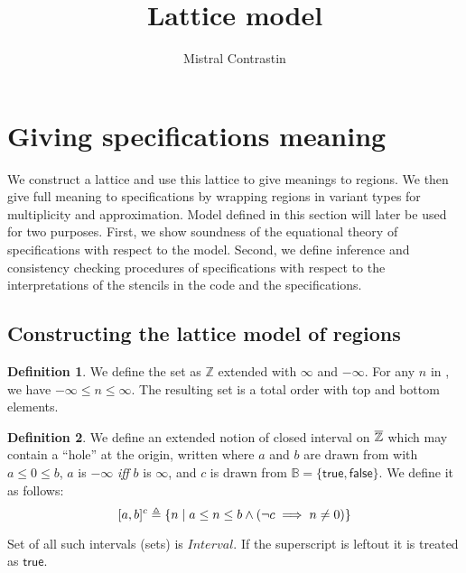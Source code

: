 \documentclass[acmlarge,review]{acmart}
\theoremstyle{definition}
\newtheorem{defn}{Definition}
\theoremstyle{plain}
\theoremstyle{remark}
\begin{document}
\title{Lattice model}
\author{Mistral Contrastin}

\section{Giving specifications meaning}

We construct a lattice and use this lattice to give meanings to regions. We
then give full meaning to specifications by wrapping regions in variant types
for multiplicity and approximation. Model defined in this section will later be
used for two purposes. First, we show soundness of the equational theory of
specifications with respect to the model. Second, we define inference and
consistency checking procedures of specifications with respect to the
interpretations of the stencils in the code and the specifications.

\subsection{Constructing the lattice model of regions}

\begin{defn}
  We define the set \zinf{} as
  $\mathbb{Z}$ extended with $\infty$ and $-\infty$. For any $n$ in
  \zinf{}, we have $-\infty \leq n \leq \infty$. The resulting set is
  a total order with top and bottom elements.
\end{defn}

\begin{defn}
  We define an extended notion of closed interval on $\textnormal{$\overline{\mathbb{Z}}$}$ which may
  contain a ``hole'' at the origin, written  where $a$ and $b$
  are drawn from \zinf{} with $a \leq 0 \leq b$, $a$ is $-\infty$ \emph{iff} $b$
  is $\infty$, and $c$ is drawn from $\mathbb{B} = \{ \mathsf{true}, \mathsf{false} \}$. We
  define it as follows:
%
  \begin{equation*}
    \textnormal{$\lbrack a,b\rbrack^{c}$} \triangleq
      \{ n \;|\; a \leq n \leq b \wedge (\neg c \implies n \neq 0) \}
  \end{equation*}

  Set of all such intervals (sets) is $\textit{Interval}$. If the superscript is
  leftout it is treated as $\mathsf{true}$.
\end{defn}
\end{document}
